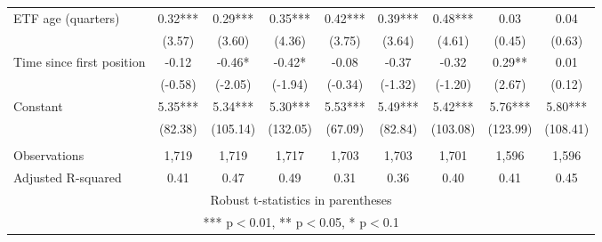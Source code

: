 \documentclass[]{article}
\begin{document}
\begin{tabular}{lcccccccc}
ETF age (quarters) & 0.32*** & 0.29*** & 0.35*** & 0.42*** & 0.39*** & 0.48*** & 0.03 & 0.04 \\
 & (3.57) & (3.60) & (4.36) & (3.75) & (3.64) & (4.61) & (0.45) & (0.63) \\
Time since first position & -0.12 & -0.46* & -0.42* & -0.08 & -0.37 & -0.32 & 0.29** & 0.01 \\
 & (-0.58) & (-2.05) & (-1.94) & (-0.34) & (-1.32) & (-1.20) & (2.67) & (0.12) \\
Constant & 5.35*** & 5.34*** & 5.30*** & 5.53*** & 5.49*** & 5.42*** & 5.76*** & 5.80*** \\
 & (82.38) & (105.14) & (132.05) & (67.09) & (82.84) & (103.08) & (123.99) & (108.41) \\
 &  &  &  &  &  &  &  &  \\
Observations & 1,719 & 1,719 & 1,717 & 1,703 & 1,703 & 1,701 & 1,596 & 1,596 \\
 Adjusted R-squared & 0.41 & 0.47 & 0.49 & 0.31 & 0.36 & 0.40 & 0.41 & 0.45 \\ \hline
\multicolumn{9}{c}{ Robust t-statistics in parentheses} \\
\multicolumn{9}{c}{ *** p$<$0.01, ** p$<$0.05, * p$<$0.1} \\
\end{tabular}
\end{document}
